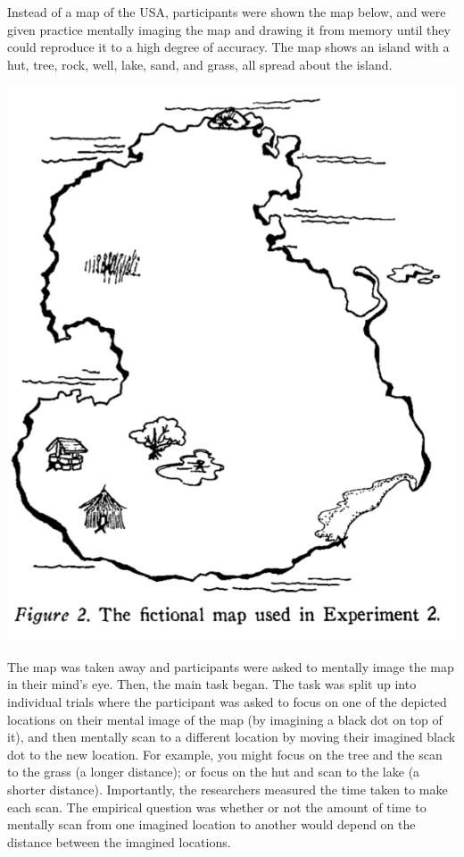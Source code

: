 \documentclass[
  oneside,
  12pt]{crumpbook}
\begin{document}
Instead of a map of the USA, participants were shown the map below, and were given practice mentally imaging the map and drawing it from memory until they could reproduce it to a high degree of accuracy. The map shows an island with a hut, tree, rock, well, lake, sand, and grass, all spread about the island.

\includegraphics[width=1\linewidth]{imgs/KosslynEtAl1978Fig2}

The map was taken away and participants were asked to mentally image the map in their mind's eye. Then, the main task began. The task was split up into individual trials where the participant was asked to focus on one of the depicted locations on their mental image of the map (by imagining a black dot on top of it), and then mentally scan to a different location by moving their imagined black dot to the new location. For example, you might focus on the tree and the scan to the grass (a longer distance); or focus on the hut and scan to the lake (a shorter distance). Importantly, the researchers measured the time taken to make each scan. The empirical question was whether or not the amount of time to mentally scan from one imagined location to another would depend on the distance between the imagined locations.
\end{document}
